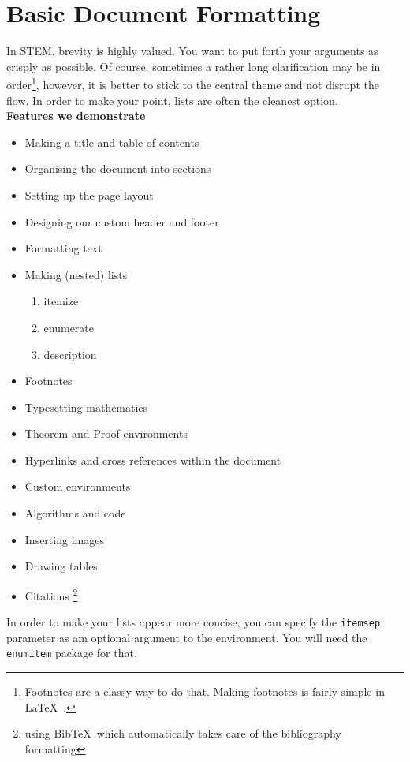 \documentclass[10pt, Computer Modern]{article}
\theoremstyle{remark}
\begin{document}
\section{Basic Document Formatting}
\label{formatting}
\renewcommand{\baselinestretch}{0.5}
In STEM, brevity is highly valued. You want to put forth your arguments as crisply as possible. Of course, sometimes a rather long clarification may be in order\footnote{Footnotes are a classy way to do that. Making footnotes is fairly simple in \LaTeX\ .}, however, it is better to stick to the central theme and not disrupt the flow. In order to make your point, lists are often the cleanest option.\\
\renewcommand{\baselinestretch}{1}
\vspace{8pt}
\setlength{\parindent}{0em}\large{\textbf{ Features we demonstrate}}
\normalsize
\begin{itemize}[itemsep=-1pt]
	\item Making a title and table of contents
	\item Organising the document into sections
	\item Setting up the page layout
	\item Designing our custom header and footer
	\item Formatting text
	\item Making (nested) lists
	\begin{enumerate}[noitemsep]
		\item itemize
		\item enumerate 
		\item description
	\end{enumerate}	
	\item Footnotes
	\item Typesetting mathematics
	\item Theorem and Proof environments
	\item Hyperlinks and cross references within the document 
	\item Custom environments
	\item Algorithms and code
	\item Inserting images
	\item Drawing tables
	\item \renewcommand{\thefootnote}{\fnsymbol{footnote}}
			Citations \footnote{using Bib\TeX\, which automatically takes care of the bibliography formatting}
\end{itemize}	
In order to make your lists appear more concise, you can specify the \verb!itemsep! parameter as am optional argument to the environment. You will need the \verb!enumitem! package for that.
\end{document}

